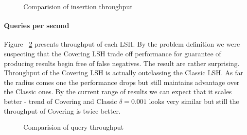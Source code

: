 \begin{figure}[ht]

  \caption{Comparision of insertion throughput}
  \label{fig:insertions-per-second}
\end{figure}

\paragraph{Queries per second}
Figure ~\ref{fig:queries-per-second} presents throughput of each LSH. By the
problem definition we were suspecting that the Covering LSH trade off
performance for guarantee of producing results begin free of false negatives.
The result are rather surprising. Throughput of the Covering LSH is actually
outclassing the Classic LSH. As far the radius comes one the performance drops
but still maintains advantage over the Classic ones. By the current range of
results we can expect that it scales better - trend of Covering and Classic
$\delta = 0.001$ looks very similar but still the throughput of Covering is
twice better.   
\begin{figure}[ht]

  \caption{Comparision of query throughput}
  \label{fig:queries-per-second}
\end{figure}

